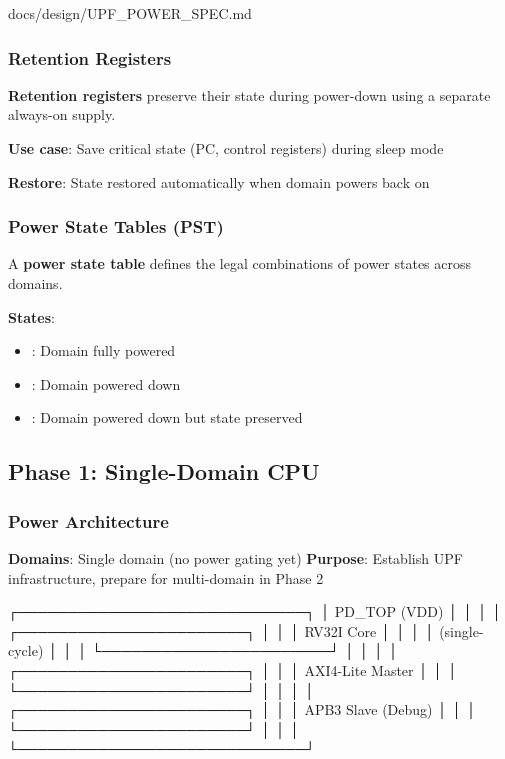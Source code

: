 \begin{relocated}{docs/design/UPF_POWER_SPEC.md}
\subsubsection{Retention Registers}\label{ds:ch:upf-power-spec:retention-registers}

\textbf{Retention registers} preserve their state during power-down
using a separate always-on supply.

\textbf{Use case}: Save critical state (PC, control registers) during
sleep mode

\textbf{Restore}: State restored automatically when domain powers back
on

\subsubsection{Power State Tables (PST)}\label{ds:ch:upf-power-spec:power-state-tables-pst}

A \textbf{power state table} defines the legal combinations of power
states across domains.

\textbf{States}:

\begin{itemize}
\tightlist
\item
  : Domain fully powered
\item
  : Domain powered down
\item
  : Domain powered down but state preserved
\end{itemize}

\subsection{Phase 1: Single-Domain CPU}\label{ds:ch:upf-power-spec:phase-1-single-domain-cpu}

\subsubsection{Power Architecture}\label{ds:ch:upf-power-spec:power-architecture}

\textbf{Domains}: Single domain (no power gating yet) \textbf{Purpose}:
Establish UPF infrastructure, prepare for multi-domain in Phase 2

\begin{textblock}
┌─────────────────────────────┐
│       PD_TOP (VDD)          │
│                             │
│  ┌───────────────────────┐  │
│  │    RV32I Core         │  │
│  │  (single-cycle)       │  │
│  └───────────────────────┘  │
│                             │
│  ┌───────────────────────┐  │
│  │  AXI4-Lite Master     │  │
│  └───────────────────────┘  │
│                             │
│  ┌───────────────────────┐  │
│  │  APB3 Slave (Debug)   │  │
│  └───────────────────────┘  │
│                             │
└─────────────────────────────┘
\end{textblock}


\end{relocated}
